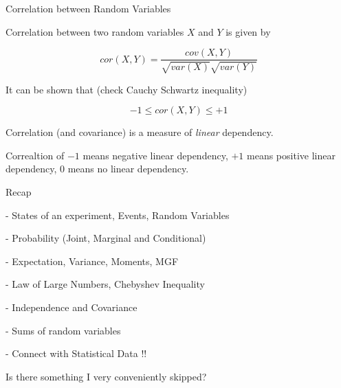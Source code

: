 \documentclass{beamer}\usepackage[]{graphicx}\usepackage[]{color}
\begin{document}
\begin{frame}{Correlation between Random Variables}

Correlation between two random variables $X$ and $Y$ is given by

$$ cor(X,Y) = \frac{cov(X,Y)}{\sqrt{var(X)}\sqrt{var(Y)}} $$

It can be shown that  (check Cauchy Schwartz inequality)

$$ -1 \leq cor(X,Y) \leq +1 $$

Correlation (and covariance) is a measure of \emph{linear} dependency.

Correaltion of $-1$ means negative linear dependency, $+1$ means positive linear dependency, $0$ means no linear dependency.

\end{frame}

\begin{frame}{Recap}

- States of an experiment, Events, Random Variables

- Probability (Joint, Marginal and Conditional)

- Expectation, Variance, Moments, MGF

- Law of Large Numbers, Chebyshev Inequality

- Independence and Covariance

- Sums of random variables

- Connect with Statistical Data !!

\end{frame}

\begin{frame}{}

\begin{center}
\Huge{Is there something I very conveniently skipped?}
\end{center}

\end{frame}
\end{document}
